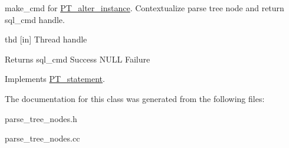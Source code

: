 make\+\_\+cmd for \mbox{\hyperlink{classPT__alter__instance}{P\+T\+\_\+alter\+\_\+instance}}. Contextualize parse tree node and return sql\+\_\+cmd handle. 

thd \mbox{[}in\mbox{]} Thread handle

\begin{DoxyReturn}{Returns}
sql\+\_\+cmd Success N\+U\+LL Failure 
\end{DoxyReturn}


Implements \mbox{\hyperlink{classPT__statement}{P\+T\+\_\+statement}}.



The documentation for this class was generated from the following files\+:\begin{DoxyCompactItemize}
\item 
parse\+\_\+tree\+\_\+nodes.\+h\item 
parse\+\_\+tree\+\_\+nodes.\+cc\end{DoxyCompactItemize}
